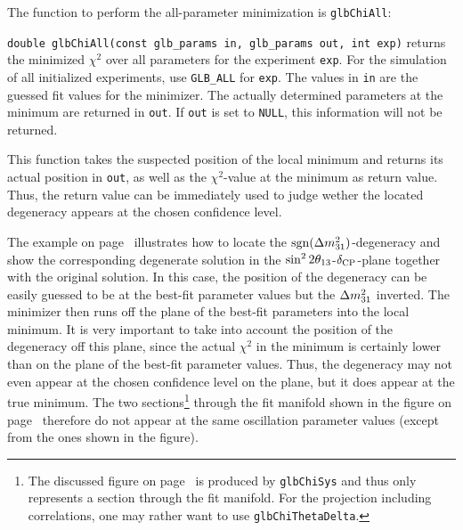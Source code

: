 The function to perform the all-parameter minimization is {\tt glbChiAll}:
\begin{function}
{\tt double glbChiAll(const glb\_params in, glb\_params out, int exp)}
  returns the minimized $\chi^2$ over all parameters for the  experiment {\tt exp}. For the simulation of all initialized experiments,
use {\tt GLB\_ALL} for {\tt exp}. The values in {\tt in} are the guessed fit values for the minimizer. The actually determined parameters at the minimum are returned in {\tt out}. If {\tt out} is set to {\tt NULL}, this information will not be returned.
\end{function}
%
This function takes the suspected position of the local minimum and returns its actual position in {\tt out}, as well as the $\chi^2$-value 
at the minimum as return value. Thus, the return value can be immediately
used to judge wether the located degeneracy appears at the chosen
confidence level.

The example on page~\pageref{ex:sgndeg} illustrates how to locate the $\mathrm{sgn}(\Delta m_{31}^2)$-degeneracy and show the corresponding degenerate solution in the $\sin^2 2 \theta_{13}$-$\delta_{\mathrm{CP}}$-plane together with the original solution.
In this case, the position of the degeneracy can be easily guessed to be at the best-fit parameter values but the $\Delta m_{31}^2$ inverted. The minimizer then runs off the plane of the best-fit parameters into the local minimum. It is very important to take into account the position of the degeneracy off this plane, since the actual $\chi^2$ in the minimum is certainly lower than on the plane of the best-fit parameter values. Thus, the degeneracy may not even appear at the chosen confidence level on the plane, but it does appear at the true minimum. The two sections\footnote{The discussed figure on page~\pageref{ex:sgndeg} is produced by  {\tt glbChiSys} and thus only represents a section through the fit manifold. For the projection including correlations, one may rather want to use {\tt glbChiThetaDelta}.} through the fit manifold shown in the figure on page~\pageref{ex:sgndeg} therefore do not appear at the same oscillation parameter values (except from the ones shown in the figure). 

